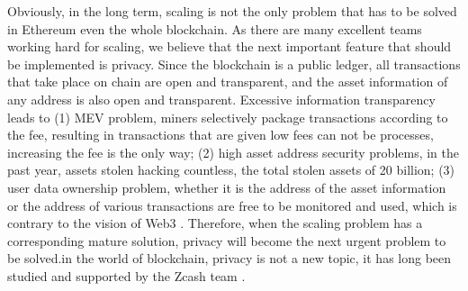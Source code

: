 Obviously, in the long term, scaling is not the only problem that has to be solved in Ethereum \cite{website:Ethereum} even the whole blockchain. As there are
many excellent teams working hard for scaling, we believe that the next important feature that should be implemented is privacy. Since the blockchain is 
a public ledger, all transactions that take place on chain are open and transparent, 
and the asset information of any address is also open and transparent. Excessive 
information transparency leads to (1) MEV problem, miners selectively package 
transactions according to the fee, resulting in transactions that are given low fees can not be 
processes, increasing the fee is the only way; (2) high asset address security problems, in the past 
year, assets stolen hacking countless, the total stolen assets of 20 billion; (3) user data 
ownership problem, whether it is the address of the asset information or the address of 
various transactions are free to be monitored and used, which is contrary to 
the vision of Web3 \cite{website:Web3}. Therefore, when the scaling problem has a corresponding mature solution, privacy will become the next urgent problem to be solved.in the world of 
blockchain, privacy is not a new topic, it has long been studied and supported by the Zcash team \cite{website:Zcash}.





